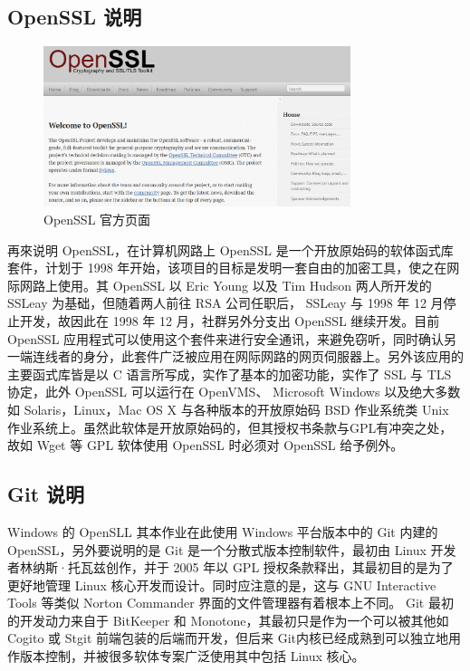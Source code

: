 \subsection{OpenSSL 说明}

\begin{figure}[htb]
\centering 
\includegraphics[width=0.80\textwidth]{img/ch1s2m1.png} 
\caption{OpenSSL 官方页面}
\label{Test}
\end{figure}

再來说明 OpenSSL，在计算机网路上 OpenSSL 是一个开放原始码的软体函式库套件，计划于 1998 年开始，该项目的目标是发明一套自由的加密工具，使之在网际网路上使用。其 OpenSSL 以 Eric Young 以及 Tim Hudson 两人所开发的 SSLeay 为基础，但随着两人前往 RSA 公司任职后， SSLeay 与 1998 年 12 月停止开发，故因此在 1998 年 12 月，社群另外分支出 OpenSSL 继续开发。目前 OpenSSL 应用程式可以使用这个套件来进行安全通讯，来避免窃听，同时确认另一端连线者的身分，此套件广泛被应用在网际网路的网页伺服器上。另外该应用的主要函式库皆是以 C 语言所写成，实作了基本的加密功能，实作了 SSL 与 TLS 协定，此外 OpenSSL 可以运行在 OpenVMS、 Microsoft Windows 以及绝大多数如 Solaris，Linux，Mac OS X 与各种版本的开放原始码 BSD 作业系统类 Unix 作业系统上。虽然此软体是开放原始码的，但其授权书条款与GPL有冲突之处，故如 Wget 等 GPL 软体使用 OpenSSL 时必须对 OpenSSL 给予例外。

\subsection{Git 说明}

Windows 的 OpenSLL 其本作业在此使用 Windows 平台版本中的 Git 内建的 OpenSSL，另外要说明的是 Git 是一个分散式版本控制软件，最初由 Linux 开发者林纳斯·托瓦兹创作，并于 2005 年以 GPL 授权条款释出，其最初目的是为了更好地管理 Linux 核心开发而设计。同时应注意的是，这与 GNU Interactive Tools 等类似 Norton Commander 界面的文件管理器有着根本上不同。 Git 最初的开发动力来自于 BitKeeper 和 Monotone，其最初只是作为一个可以被其他如 Cogito 或 Stgit 前端包装的后端而开发，但后来 Git内核已经成熟到可以独立地用作版本控制，并被很多软体专案广泛使用其中包括 Linux 核心。

